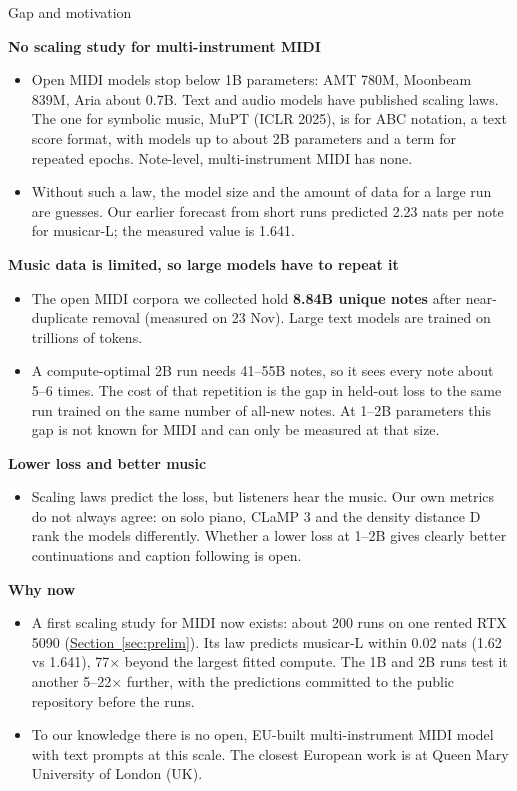 \documentclass[11pt,a4paper]{article}
\makeatletter
\newcommand{\seclink}[2]{\hyperref[#1]{\textcolor{blue!60!black}{\underline{#2}}}}
\renewcommand\subsection{\@startsection{subsection}{2}{\z@}{-2.6ex \@plus -1ex \@minus -.2ex}{1.2ex \@plus .2ex}%
  {\normalfont\large\bfseries\color{head}}}
\makeatother
\begin{document}
\subsection{Gap and motivation}\label{sec:gap}

\textbf{No scaling study for multi-instrument MIDI}
\begin{itemize}
\item Open MIDI models stop below 1B parameters: AMT 780M, Moonbeam 839M, Aria about 0.7B. Text and audio models have
published scaling laws. The one for symbolic music, MuPT (ICLR 2025), is for ABC notation, a text score format,
with models up to about 2B parameters and a term for repeated epochs. Note-level, multi-instrument MIDI has none.
\item Without such a law, the model size and the amount of data for a large run are guesses. Our earlier forecast from
short runs predicted 2.23 nats per note for musicar-L; the measured value is 1.641.
\end{itemize}

\medskip
\textbf{Music data is limited, so large models have to repeat it}
\begin{itemize}
\item The open MIDI corpora we collected hold \textbf{8.84B unique notes} after near-duplicate removal (measured on 23
Nov). Large text models are trained on trillions of tokens.
\item A compute-optimal 2B run needs 41--55B notes, so it sees every note about 5--6 times. The cost of that repetition
is the gap in held-out loss to the same run trained on the same number of all-new notes. At 1--2B parameters this
gap is not known for MIDI and can only be measured at that size.
\end{itemize}

\medskip
\textbf{Lower loss and better music}
\begin{itemize}
\item Scaling laws predict the loss, but listeners hear the music. Our own metrics do not always agree: on solo piano,
CLaMP 3 and the density distance D rank the models differently. Whether a lower loss at 1--2B gives clearly better
continuations and caption following is open.
\end{itemize}

\medskip
\textbf{Why now}
\begin{itemize}
\item A first scaling study for MIDI now exists: about 200 runs on one rented RTX 5090
(\seclink{sec:prelim}{Section~\ref*{sec:prelim}}). Its law predicts musicar-L within 0.02 nats (1.62 vs 1.641),
77$\times$ beyond the largest fitted compute. The 1B and 2B runs test it another 5--22$\times$ further, with the
predictions committed to the public repository before the runs.
\item To our knowledge there is no open, EU-built multi-instrument MIDI model with text prompts at this scale. The
closest European work is at Queen Mary University of London (UK).
\end{itemize}
\end{document}
